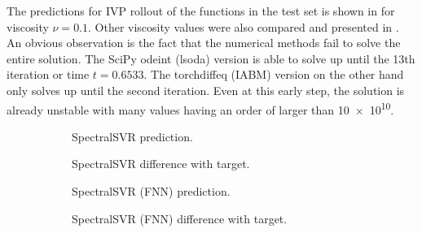 \documentclass[preprint,12pt,times,authoryear]{elsarticle}
\begin{document}
The predictions for IVP rollout of the functions in the test set is shown in  for viscosity \(\nu=0.1\). Other viscosity values were also compared and presented in . An obvious observation is the fact that the numerical methods fail to solve the entire solution. The SciPy odeint (lsoda) version is able to solve up until the 13th iteration or time \(t=0.6533\). The torchdiffeq (IABM) version on the other hand only solves up until the second iteration. Even at this early step, the solution is already unstable with many values having an order of larger than \num{10e10}.
\begin{figure}[hbp]
  \centering
  \begin{adjustwidth}{-0.05\linewidth}{-0.05\linewidth}
    \begin{subfigure}{0.49\linewidth}
      \begin{adjustbox}{width=\linewidth}
        
      \end{adjustbox}
      \caption{SpectralSVR prediction.}\label{fig:comp_lssvr_pred_0.1}
    \end{subfigure}
    \begin{subfigure}{0.49\linewidth}
      \begin{adjustbox}{width=\linewidth}
        
      \end{adjustbox}
      \caption{SpectralSVR difference with target.}\label{fig:comp_lssvr_diff_0.1}
    \end{subfigure}
    \begin{subfigure}{0.49\linewidth}
      \begin{adjustbox}{width=\linewidth}
        
      \end{adjustbox}
      \caption{SpectralSVR (FNN) prediction.}\label{fig:comp_fnn_pred_0.1}
    \end{subfigure}
    \begin{subfigure}{0.49\linewidth}
      \begin{adjustbox}{width=\linewidth}
        
      \end{adjustbox}
      \caption{SpectralSVR (FNN) difference with target.}\label{fig:comp_fnn_diff_0.1}
    \end{subfigure}
    \begin{subfigure}{0.49\linewidth}

\end{subfigure}
\end{adjustwidth}
\end{figure}
\end{document}

